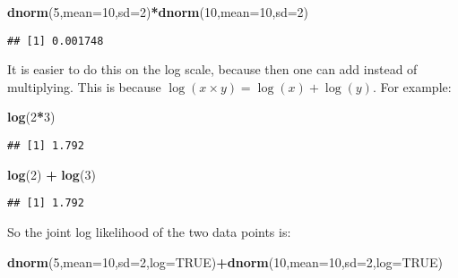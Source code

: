 \documentclass[12pt,]{krantz}
\newenvironment{Shaded}{\begin{snugshade}}{\end{snugshade}}
\newcommand{\DataTypeTok}[1]{\textcolor[rgb]{0.13,0.29,0.53}{#1}}
\newcommand{\DecValTok}[1]{\textcolor[rgb]{0.00,0.00,0.81}{#1}}
\newcommand{\KeywordTok}[1]{\textcolor[rgb]{0.13,0.29,0.53}{\textbf{#1}}}
\newcommand{\NormalTok}[1]{#1}
\newcommand{\OperatorTok}[1]{\textcolor[rgb]{0.81,0.36,0.00}{\textbf{#1}}}
\newcommand{\OtherTok}[1]{\textcolor[rgb]{0.56,0.35,0.01}{#1}}
\newcommand{\StringTok}[1]{\textcolor[rgb]{0.31,0.60,0.02}{#1}}
\begin{document}
\begin{Shaded}
\begin{Highlighting}[]
\KeywordTok{dnorm}\NormalTok{(}\DecValTok{5}\NormalTok{,}\DataTypeTok{mean=}\DecValTok{10}\NormalTok{,}\DataTypeTok{sd=}\DecValTok{2}\NormalTok{)}\OperatorTok{*}\KeywordTok{dnorm}\NormalTok{(}\DecValTok{10}\NormalTok{,}\DataTypeTok{mean=}\DecValTok{10}\NormalTok{,}\DataTypeTok{sd=}\DecValTok{2}\NormalTok{)}
\end{Highlighting}
\end{Shaded}

\begin{verbatim}
## [1] 0.001748
\end{verbatim}

It is easier to do this on the log scale, because then one can add instead of multiplying. This is because \(\log(x\times y)= \log(x) + \log(y)\). For example:

\begin{Shaded}
\begin{Highlighting}[]
\KeywordTok{log}\NormalTok{(}\DecValTok{2}\OperatorTok{*}\DecValTok{3}\NormalTok{)}
\end{Highlighting}
\end{Shaded}

\begin{verbatim}
## [1] 1.792
\end{verbatim}

\begin{Shaded}
\begin{Highlighting}[]
\KeywordTok{log}\NormalTok{(}\DecValTok{2}\NormalTok{) }\OperatorTok{+}\StringTok{ }\KeywordTok{log}\NormalTok{(}\DecValTok{3}\NormalTok{)}
\end{Highlighting}
\end{Shaded}

\begin{verbatim}
## [1] 1.792
\end{verbatim}

So the joint log likelihood of the two data points is:

\begin{Shaded}
\begin{Highlighting}[]
\KeywordTok{dnorm}\NormalTok{(}\DecValTok{5}\NormalTok{,}\DataTypeTok{mean=}\DecValTok{10}\NormalTok{,}\DataTypeTok{sd=}\DecValTok{2}\NormalTok{,}\DataTypeTok{log=}\OtherTok{TRUE}\NormalTok{)}\OperatorTok{+}\KeywordTok{dnorm}\NormalTok{(}\DecValTok{10}\NormalTok{,}\DataTypeTok{mean=}\DecValTok{10}\NormalTok{,}\DataTypeTok{sd=}\DecValTok{2}\NormalTok{,}\DataTypeTok{log=}\OtherTok{TRUE}\NormalTok{)}
\end{Highlighting}
\end{Shaded}
\end{document}
